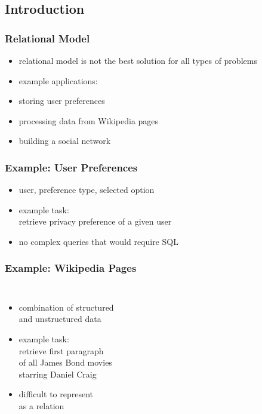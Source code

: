\documentclass[dvipsnames]{beamer}
\theoremstyle{plain}
\begin{document}
\subsection{Introduction}

\begin{frame}
  \frametitle{Relational Model}

  \begin{itemize}
    \item relational model is not the best solution for all types of problems

    \bigskip
    \item example applications:
    \smallskip
    \item storing user preferences
    \item processing data from Wikipedia pages
    \item building a social network
  \end{itemize}
\end{frame}

\begin{frame}
  \frametitle{Example: User Preferences}

  \begin{itemize}
    \item user, preference type, selected option

    \medskip
    \item example task:\\
      retrieve privacy preference of a given user

    \pause
    \medskip
    \item no complex queries that would require SQL
  \end{itemize}
\end{frame}

\begin{frame}
  \frametitle{Example: Wikipedia Pages}

  \begin{columns}

    \begin{itemize}
      \item combination of structured\\
        and unstructured data

      \medskip
      \item example task:\\
        retrieve first paragraph\\
        of all James Bond movies\\
        starring Daniel Craig

      \pause
      \medskip
      \item difficult to represent\\
        as a relation
    \end{itemize}
  \end{columns}
\end{frame}
\end{document}
